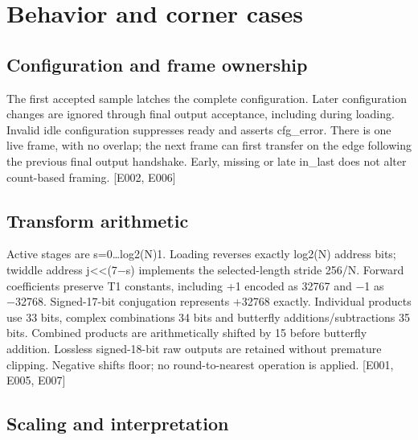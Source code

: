 \documentclass[11pt,a4paper]{article}
\begin{document}
\section{Behavior and corner cases}

\subsection{Configuration and frame ownership}

The first accepted sample latches the complete configuration. Later configuration changes are ignored through final output acceptance,\allowbreak{} including during loading. Invalid idle configuration suppresses ready and asserts cfg\_\allowbreak{}error. There is one live frame,\allowbreak{} with no overlap; the next frame can first transfer on the edge following the previous final output handshake. Early,\allowbreak{} missing or late in\_\allowbreak{}last does not alter count-based framing. [\allowbreak{}E002,\allowbreak{} E006]\allowbreak{}

\subsection{Transform arithmetic}

Active stages are s=\allowbreak{}0…log2(\allowbreak{}N)1. Loading reverses exactly log2(\allowbreak{}N)\allowbreak{} address bits; twiddle address j<<(\allowbreak{}7{\vulcanmathsymbols −}s)\allowbreak{} implements the selected-length stride 256/\allowbreak{}N. Forward coefficients preserve T1 constants,\allowbreak{} including +\allowbreak{}1 encoded as 32767 and {\vulcanmathsymbols −}1 as {\vulcanmathsymbols −}32768. Signed-17-bit conjugation represents +\allowbreak{}32768 exactly. Individual products use 33 bits,\allowbreak{} complex combinations 34 bits and butterfly additions/\allowbreak{}subtractions 35 bits. Combined products are arithmetically shifted by 15 before butterfly addition. Lossless signed-18-bit raw outputs are retained without premature clipping. Negative shifts floor; no round-to-nearest operation is applied. [\allowbreak{}E001,\allowbreak{} E005,\allowbreak{} E007]\allowbreak{}

\subsection{Scaling and interpretation}
\end{document}
